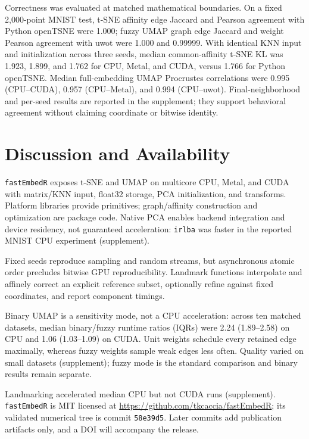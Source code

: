 \documentclass[twoside,11pt]{article}
\newcommand{\pkg}{\texttt{fastEmbedR}}
\begin{document}
Correctness was evaluated at matched mathematical boundaries. On a fixed 2,000-point MNIST test, t-SNE affinity edge Jaccard and Pearson agreement with Python openTSNE were 1.000; fuzzy UMAP graph edge Jaccard and weight Pearson agreement with uwot were 1.000 and 0.99999. With identical KNN input and initialization across three seeds, median common-affinity t-SNE KL was 1.923, 1.899, and 1.762 for CPU, Metal, and CUDA, versus 1.766 for Python openTSNE. Median full-embedding UMAP Procrustes correlations were 0.995 (CPU--CUDA), 0.957 (CPU--Metal), and 0.994 (CPU--uwot). Final-neighborhood and per-seed results are reported in the supplement; they support behavioral agreement without claiming coordinate or bitwise identity.

\section{Discussion and Availability}

\pkg{} exposes t-SNE and UMAP on multicore CPU, Metal, and CUDA with matrix/KNN input, float32 storage, PCA initialization, and transforms. Platform libraries provide primitives; graph/affinity construction and optimization are package code. Native PCA enables backend integration and device residency, not guaranteed acceleration: \texttt{irlba} was faster in the reported MNIST CPU experiment (supplement).

Fixed seeds reproduce sampling and random streams, but asynchronous atomic order precludes bitwise GPU reproducibility. Landmark functions interpolate and affinely correct an explicit reference subset, optionally refine against fixed coordinates, and report component timings.

Binary UMAP is a sensitivity mode, not a CPU acceleration: across ten matched datasets, median binary/fuzzy runtime ratios (IQRs) were 2.24 (1.89--2.58) on CPU and 1.06 (1.03--1.09) on CUDA. Unit weights schedule every retained edge maximally, whereas fuzzy weights sample weak edges less often. Quality varied on small datasets (supplement); fuzzy mode is the standard comparison and binary results remain separate.

Landmarking accelerated median CPU but not CUDA runs (supplement). \pkg{} is MIT licensed at \url{https://github.com/tkcaccia/fastEmbedR}; its validated numerical tree is commit \texttt{58e39d5}. Later commits add publication artifacts only, and a DOI will accompany the release.

\clearpage
\end{document}
